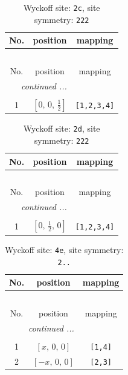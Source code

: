 \documentclass[fleqn,8pt]{jsarticle}
\begin{document}
\begin{longtable}{ccc}
\caption{Wyckoff site: {\tt 2c}, site symmetry: {\tt 222}}
 \\
 \hline \hline
No. & position & mapping \\ \hline \endfirsthead

\multicolumn{2}{l}{\tablename\ \thetable{}} \\
 \hline \hline
No. & position & mapping \\ \hline \endhead

 \hline \hline
\multicolumn{2}{r}{\footnotesize\it continued ...} \\ \endfoot

 \hline \hline
\multicolumn{2}{r}{} \\ \endlastfoot

1 & $\left[ 0,\, 0,\, \frac{1}{2} \right]$ & {\tt [1,2,3,4]} \\
\end{longtable}
\renewcommand{\arraystretch}{1.2}
\begin{longtable}{ccc}
\caption{Wyckoff site: {\tt 2d}, site symmetry: {\tt 222}}
 \\
 \hline \hline
No. & position & mapping \\ \hline \endfirsthead

\multicolumn{2}{l}{\tablename\ \thetable{}} \\
 \hline \hline
No. & position & mapping \\ \hline \endhead

 \hline \hline
\multicolumn{2}{r}{\footnotesize\it continued ...} \\ \endfoot

 \hline \hline
\multicolumn{2}{r}{} \\ \endlastfoot

1 & $\left[ 0,\, \frac{1}{2},\, 0 \right]$ & {\tt [1,2,3,4]} \\
\end{longtable}
\renewcommand{\arraystretch}{1.2}
\begin{longtable}{ccc}
\caption{Wyckoff site: {\tt 4e}, site symmetry: {\tt 2..}}
 \\
 \hline \hline
No. & position & mapping \\ \hline \endfirsthead

\multicolumn{2}{l}{\tablename\ \thetable{}} \\
 \hline \hline
No. & position & mapping \\ \hline \endhead

 \hline \hline
\multicolumn{2}{r}{\footnotesize\it continued ...} \\ \endfoot

 \hline \hline
\multicolumn{2}{r}{} \\ \endlastfoot

1 & $\left[ x,\, 0,\, 0 \right]$ & {\tt [1,4]} \\ \hline
2 & $\left[ - x,\, 0,\, 0 \right]$ & {\tt [2,3]} \\
\end{longtable}
\end{document}

